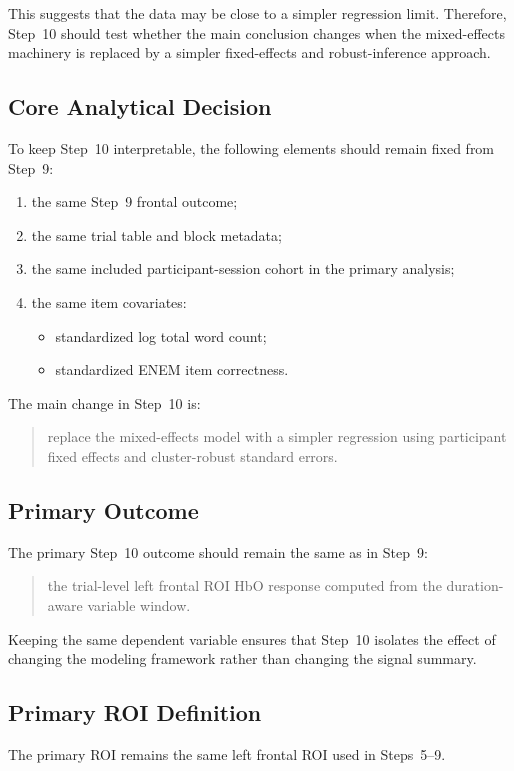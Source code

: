 This suggests that the data may be close to a simpler regression limit.
Therefore, Step~10 should test whether the main conclusion changes when the mixed-effects machinery
is replaced by a simpler fixed-effects and robust-inference approach.

\subsection{Core Analytical Decision}
To keep Step~10 interpretable, the following elements should remain fixed from Step~9:
\begin{enumerate}
    \item the same Step~9 frontal outcome;
    \item the same trial table and block metadata;
    \item the same included participant-session cohort in the primary analysis;
    \item the same item covariates:
    \begin{itemize}
        \item standardized log total word count;
        \item standardized ENEM item correctness.
    \end{itemize}
\end{enumerate}

The main change in Step~10 is:
\begin{quote}
replace the mixed-effects model with a simpler regression using participant fixed effects and
cluster-robust standard errors.
\end{quote}

\subsection{Primary Outcome}
The primary Step~10 outcome should remain the same as in Step~9:
\begin{quote}
the trial-level left frontal ROI HbO response computed from the duration-aware variable window.
\end{quote}

Keeping the same dependent variable ensures that Step~10 isolates the effect of changing the
modeling framework rather than changing the signal summary.

\subsection{Primary ROI Definition}
The primary ROI remains the same left frontal ROI used in Steps~5--9.

